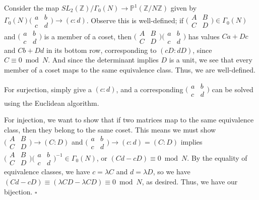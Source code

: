 \documentclass[11pt, oneside]{article}   	%
\begin{document}
Consider the map $SL_2(\mathbb{Z})/\Gamma_0 (N)\rightarrow \mathbb{P}^1(\mathbb{Z}/N\mathbb{Z})$ given by $\Gamma_0 (N)\bigl( \begin{smallmatrix}a & b\\ c & d\end{smallmatrix}\bigr)\rightarrow (c:d)$. Observe this is well-defined; if $\bigl( \begin{smallmatrix}A & B\\ C & D\end{smallmatrix}\bigr)\in \Gamma_0 (N)$ and $\bigl( \begin{smallmatrix}a & b\\ c & d\end{smallmatrix}\bigr)$ is a member of a coset, then $\bigl( \begin{smallmatrix}A & B\\ C & D\end{smallmatrix}\bigr)\bigl( \begin{smallmatrix}a & b\\ c & d\end{smallmatrix}\bigr)$ has values $Ca+Dc$ and $Cb+Dd$ in its bottom row, corresponding to $(cD:dD)$, since $C\equiv 0 \bmod{N}$. And since the determinant implies $D$ is a unit, we see that every member of a coset maps to the same equivalence class. Thus, we are well-defined.

For surjection, simply give a $(c:d)$, and a corresponding $\bigl( \begin{smallmatrix}a & b\\ c & d\end{smallmatrix}\bigr)$ can be solved using the Euclidean algorithm.

For injection, we want to show that if two matrices map to the same equivalence class, then they belong to the same coset. This means we must show $\bigl( \begin{smallmatrix}A & B\\ C & D\end{smallmatrix}\bigr)\rightarrow (C:D)$ and $\bigl( \begin{smallmatrix}a & b\\ c & d\end{smallmatrix}\bigr)\rightarrow (c:d)=(C:D)$ implies $\bigl( \begin{smallmatrix}A & B\\ C & D\end{smallmatrix}\bigr)\bigl( \begin{smallmatrix}a & b\\ c & d\end{smallmatrix}\bigr)^{-1}\in \Gamma_0 (N)$, or $(Cd-cD)\equiv 0\bmod{N}$. By the equality of equivalence classes, we have $c=\lambda C$ and $d=\lambda D$, so we have $(Cd-cD)\equiv(\lambda CD-\lambda CD)\equiv 0 \bmod{N}$, as desired. Thus, we have our bijection. $\square$
\end{document}
